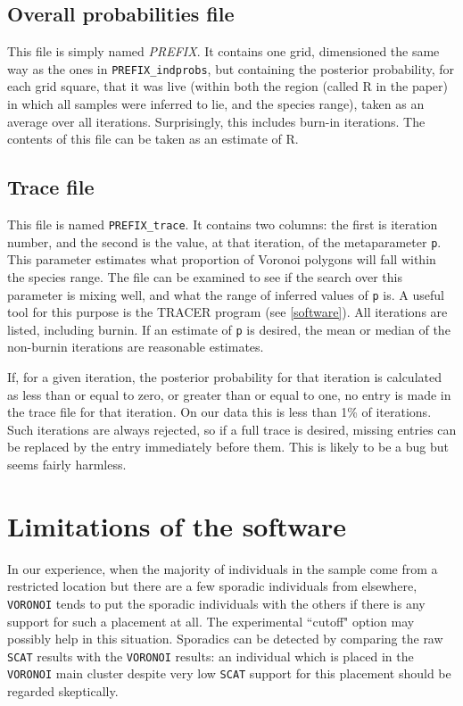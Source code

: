 \documentclass[10pt,titlepage,times,letterpaper]{article}
\def\SCAT{{\tt SCAT} }
\def\VORONOI{{\tt VORONOI} }
\begin{document}
\subsection{Overall probabilities file}

This file is simply named {\it PREFIX}.  It contains one grid, dimensioned the same
way as the ones in {\tt PREFIX\_indprobs}, but containing the posterior probability, for
each grid square, that it was live (within both the region (called R in the paper)
in which all samples were
inferred to lie, and the species range), taken as an average over all iterations.  
Surprisingly, this includes burn-in iterations.  The contents of this file can be taken
as an estimate of R.  

\subsection{Trace file}

This file is named {\tt PREFIX\_trace}.  It contains two columns:  the first is iteration
number, and the second is the value, at that iteration, of the metaparameter {\tt p}.
This parameter estimates what proportion of Voronoi polygons will fall within the
species range.  The file can be examined to see if the search over this parameter is
mixing well, and what the range of inferred values of {\tt p} is.  A useful tool
for this purpose is the TRACER program (see \ref{software}).  All iterations are
listed, including burnin.  If an estimate of {\tt p} is desired, the mean or median of
the non-burnin iterations are reasonable estimates.

If, for a given iteration, the posterior probability for that iteration is calculated
as less than or equal to zero, or greater than or equal to one, no entry is made in the trace 
file for that iteration.
On our data this is less than 1\% of iterations.  Such iterations
are always rejected, so if a full trace is desired, missing entries can be replaced by
the entry immediately before them.  This is likely to be a bug but seems fairly
harmless.

\section{Limitations of the software} \label{limitations}

In our experience, when the majority of individuals in the sample come from a restricted
location but there are a few sporadic individuals from elsewhere, \VORONOI tends to put
the sporadic individuals with the others if there is any support for such a placement at
all.  The experimental ``cutoff" option may possibly help in this situation.   Sporadics
can be detected by comparing the raw \SCAT results with the \VORONOI results:  an individual
which is placed in the \VORONOI main cluster despite very low \SCAT support for this placement
should be regarded skeptically. 
\end{document}
